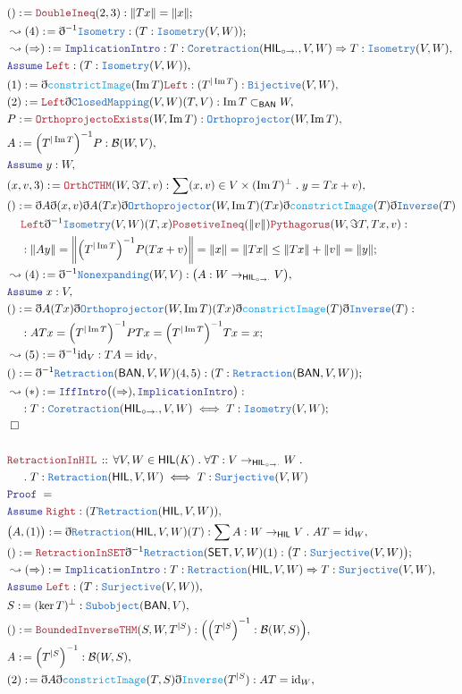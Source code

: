 \documentclass[12pt]{scrartcl}
\newcommand{\TYPE}[1]{\textcolor{NavyBlue}{\mathtt{#1}}}
\newcommand{\FUNC}[1]{\textcolor{Cerulean}{\mathtt{#1}}}
\newcommand{\LOGIC}[1]{\textcolor{Blue}{\mathtt{#1}}}
\newcommand{\THM}[1]{\textcolor{Maroon}{\mathtt{#1}}}
\renewcommand{\.}{\; . \;}
\newcommand{\de}{: \kern 0.1pc =}
\newcommand{\Theorem}[2]{& \THM{#1} \, :: \, #2 \\ & \Proof = \\ }
\newcommand{\NewLine}{\\ & \kern 1pc}
\newcommand{\Page}[1]{\begin{align*} #1 \end{align*} \newpage   }
\newcommand{ \bd }{ \ByDef }
\DeclareMathOperator*{\id}{id}
\DeclareMathOperator*{\im}{Im}
\newcommand{\Say}[3]{& #1 \de #2 : #3, \\}
\newcommand{\Conclude}[3]{& #1 \de #2 : #3; \\}
\newcommand{\Derive}[3]{& \leadsto #1 \de #2 : #3, \\}
\newcommand{\DeriveConclude}[3]{& \leadsto #1 \de #2 : #3 ; \\}
\newcommand{\A}{\LOGIC{Assume} \;}
\newcommand{\Assume}[2]{& \A #1 : #2, \\}
\newcommand{\QED}{\; \square}
\newcommand{\EndProof}{& \QED \\}
\newcommand{\ByDef}{\eth}
\newcommand{\Proof}{\LOGIC{Proof} \; }
\newcommand{\BAN}{\textsf{BAN}}
\newcommand{\HIL}{\textsf{HIL}}
\newcommand{\HILI}{{\textsf{HIL}_{\circ \to \cdot}}}
\newcommand{\B}{\mathcal{B}}
\begin{document}
\Page{
\Conclude{()}{  \THM{DoubleIneq}(2,3)}{ \| Tx \| = \| x \|}
\DeriveConclude{(4)}{\bd^{-1}\TYPE{Isometry}}{(T : \TYPE{Isometry}(V,W))}
\Derive{(\Rightarrow)}{\LOGIC{ImplicationIntro}}{T : \TYPE{Coretraction}(\HILI,V,W) \Rightarrow  T : \TYPE{Isometry}(V,W)}
\Assume{\THM{Left}}{ (T : \TYPE{Isometry}(V,W)) }
\Say{(1)}{\bd \FUNC{constrictImage}(\im T) \THM{Left}}{(T^{|\im T}) : \TYPE{Bijective}(V,W)}
\Say{(2)}{ \THM{Left}\bd\TYPE{ClosedMapping}(V,W)(T,V)}{\im T \subset_{\BAN} W }
\Say{ P }{ \THM{OrthoprojectoExists}(W, \im T)}{\TYPE{Orthoprojector}(W, \im T)}
\Say{A}{ \Big( T^{| \im T} \Big)^{-1} P}{\B(W,V)}
\Assume{y}{W}
\Say{(x,v,3)}{\THM{OrthCTHM}(W,\Im T,v)}{ \sum (x,v) \in V \times (\im T)^\bot \. y = Tx + v )}
\Conclude{()}
{
  \bd A \bd(x,v) \bd A (Tx)\bd \TYPE{Orthoprojector}(W,\im T)(T x)  \bd 
\FUNC{constrictImage}(T) \bd \TYPE{Inverse}(T)
 \NewLine
 \THM{Left} \bd^{-1}\TYPE{Isometry}(V,W)(T,x)\THM{PosetiveIneq}(\| v \|)\THM{Pythagorus}(W, \Im T, Tx, v)
}
{ \NewLine :  
 \| Ay \| = \bigg\| \Big( T^{| \im T} \Big)^{-1} P (Tx + v)  \bigg\| = \| x \| = \| Tx \| \le \| Tx \| + \| v \| = \| y \|}
\Derive{(4)}{\bd^{-1} \TYPE{Nonexpanding}(W,V)}{ \big(A : W \to_{\HILI} V \big)}
\Assume{x}{V}
\Conclude{()}{\bd A (Tx)\bd \TYPE{Orthoprojector}(W,\im T)(T x)  \bd 
\FUNC{constrictImage}(T) \bd \TYPE{Inverse}(T)}{ 
\NewLine :
ATx = \Big( T^{| \im T} \Big)^{-1} P Tx =  \Big( T^{| \im T} \Big)^{-1} T x  = x}
\Derive{(5)}{\bd^{-1} {\id}_V }{ TA = {\id} _V}
\Conclude{()}{\bd^{-1} \TYPE{Retraction}(\BAN,V,W)(4,5)}{(T : \TYPE{Retraction}(\BAN,V,W))}
\DeriveConclude{(*)}{\LOGIC{IffIntro}\big((\Rightarrow),\LOGIC{ImplicationIntro}\big)}
{ \NewLine :
  T : \TYPE{Coretraction}(\HILI,V,W) \iff T : \TYPE{Isometry}(V,W)
}
\EndProof
\\
\Theorem{RetractionInHIL}{\forall V,W \in \HIL(K) \. \forall T  
 : V \to_{\HILI} W \. \NewLine \.
 T : \TYPE{Retraction}(\HIL,V,W) \iff T : \TYPE{Surjective}(V,W)
}
\Assume{ \THM{Right} }{ (T \TYPE{Retraction}(\HIL,V,W))}
\Say{\big(A,(1) \big)}{\bd \TYPE{Retraction}(\HIL,V,W)(T)}{ \sum A : W \to_\HIL V \. AT  = {\id}_W}
\Conclude{()}{\THM{RetractionInSET}\bd^{-1} \TYPE{Retraction}(\mathsf{SET},V,W)(1)}
{\big( T : \TYPE{Surjective}(V,W) \big)}
\Derive{(\Rightarrow)}{\LOGIC{ImplicationIntro}}{T : \TYPE{Retraction}(\HIL,V,W) \Rightarrow  T : \TYPE{Surjective}(V,W)}
\Assume{\THM{Left}}{(T : \TYPE{Surjective}(V,W))}
\Say{S}{(\ker T)^\bot}{\TYPE{Subobject}(\BAN,V)}
\Say{()}{\THM{BoundedInverseTHM}(S,W,T^{|S})}{\Big( \Big(T^{| S}\Big)^{-1} : \B(W,S) \Big)}
\Say{A}{\Big(T^{| S}\Big)^{-1}}{\B(W,S)}
\Say{(2)}{\bd A\bd\FUNC{constrictImage}(T,S)\bd\FUNC{Inverse}(T^{|S})}{AT = {\id}_W}
}
\end{document}
